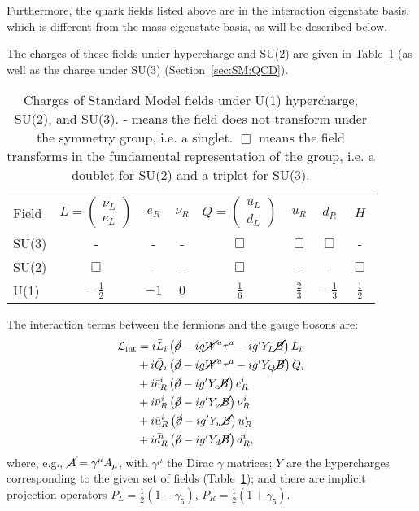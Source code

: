 Furthermore, the quark fields listed above are in the interaction eigenstate basis, which is different from the mass eigenstate basis, as will be described below.

The charges of these fields under hypercharge and SU(2) are given in Table~\ref{tab:SM:charges} (as well as the charge under SU(3) (Section~\ref{sec:SM:QCD}).
\begin{table}[]
\centering
\caption{Charges of Standard Model fields under U(1) hypercharge, SU(2), and SU(3). - means the field does not transform under the symmetry group, i.e. a singlet. $\Box$ means the field transforms in the fundamental representation of the group, i.e. a doublet for SU(2) and a triplet for SU(3).}
\label{tab:SM:charges}
\begin{tabular}{l c c c c c c c}
\hline
Field  & $L = \begin{pmatrix}\nu_L\\e_L\end{pmatrix}$  & $e_R$  & $\nu_R$ & $Q = \begin{pmatrix}u_L\\d_L\end{pmatrix}$ & $u_R$ & $d_R$ & $H$ \\
SU(3) & - & - & - & $\Box$ & $\Box$ & $\Box$ & - \\
SU(2) & $\Box$ & - & - & $\Box$ & - & - & $\Box$ \\
U(1)  & $-\frac{1}{2}$ & $-1$ & $0$ & $\frac{1}{6}$ & $\frac{2}{3}$ & $-\frac{1}{3}$ & $\frac{1}{2}$
\end{tabular}
\end{table}

The interaction terms between the fermions and the gauge bosons are:
\begin{align}
\mathcal{L}_\text{int} &= i\bar{L}_i\left(\cancel{\partial}-ig\cancel{W}^a\tau^a-ig'Y_L\cancel{B}\right)L_i\nonumber\\
            &+ i\bar{Q}_i\left(\cancel{\partial}-ig\cancel{W}^a\tau^a-ig'Y_Q\cancel{B}\right)Q_i\nonumber\\
              &+ i\bar{e}_R^i\left(\cancel{\partial}-ig'Y_e\cancel{B}\right)e_R^i\nonumber\\
              &+ i\bar{\nu}_R^i\left(\cancel{\partial}-ig'Y_\nu\cancel{B}\right)\nu_R^i\nonumber\\
              &+ i\bar{u}_R^i\left(\cancel{\partial}-ig'Y_u\cancel{B}\right)u_R^i\nonumber\\
              &+ i\bar{d}_R^i\left(\cancel{\partial}-ig'Y_d\cancel{B}\right)d_R^i,
\end{align}
where, e.g., $\cancel{A} = \gamma^\mu A_\mu$, with $\gamma^\mu$ the Dirac $\gamma$ matrices;
$Y$ are the hypercharges corresponding to the given set of fields (Table~\ref{tab:SM:charges});
and there are implicit projection operators $P_L = \frac{1}{2}(1-\gamma_5)$, $P_R = \frac{1}{2}(1+\gamma_5)$.

